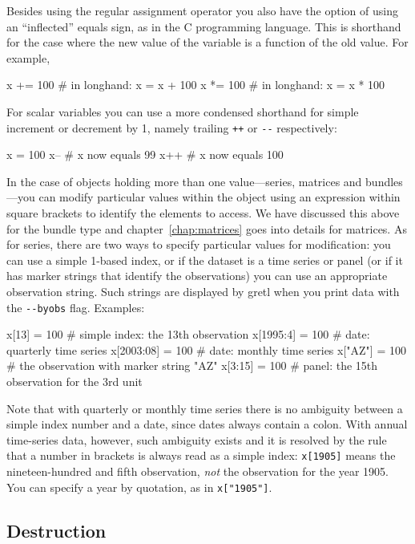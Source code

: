 Besides using the regular assignment operator you also have the option
of using an ``inflected'' equals sign, as in the C programming
language. This is shorthand for the case where the new value of the
variable is a function of the old value. For example,

\begin{code}
x += 100 # in longhand: x = x + 100
x *= 100 # in longhand: x = x * 100
\end{code} 

For scalar variables you can use a more condensed shorthand for simple
increment or decrement by 1, namely trailing \texttt{++} or \verb|--|
respectively:

\begin{code}
x = 100
x--     # x now equals 99
x++     # x now equals 100
\end{code}

In the case of objects holding more than one value---series, matrices
and bundles---you can modify particular values within the object using
an expression within square brackets to identify the elements to
access. We have discussed this above for the bundle type and
chapter~\ref{chap:matrices} goes into details for matrices. As for
series, there are two ways to specify particular values for
modification: you can use a simple 1-based index, or if the dataset is
a time series or panel (or if it has marker strings that identify the
observations) you can use an appropriate observation string. Such
strings are displayed by gretl when you print data with the
\verb|--byobs| flag. Examples:

\begin{code}
x[13]      = 100  # simple index: the 13th observation
x[1995:4]  = 100  # date: quarterly time series
x[2003:08] = 100  # date: monthly time series
x["AZ"]    = 100  # the observation with marker string "AZ"
x[3:15]    = 100  # panel: the 15th observation for the 3rd unit
\end{code}

Note that with quarterly or monthly time series there is no ambiguity
between a simple index number and a date, since dates always contain a
colon. With annual time-series data, however, such ambiguity exists
and it is resolved by the rule that a number in brackets is always
read as a simple index: \texttt{x[1905]} means the nineteen-hundred
and fifth observation, \textit{not} the observation for the year 1905.
You can specify a year by quotation, as in \verb|x["1905"]|.

\subsection{Destruction}

